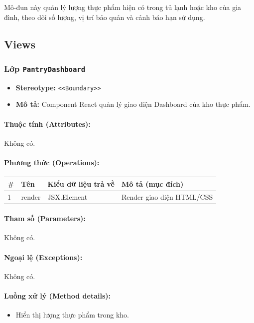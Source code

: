 \documentclass[12pt,a4paper]{article}
\begin{document}
Mô-đun này quản lý lượng thực phẩm hiện có trong tủ lạnh hoặc kho của gia đình, theo dõi số lượng, vị trí bảo quản và cảnh báo hạn sử dụng.

\subsection{Views}

\subsubsection{Lớp \texttt{PantryDashboard}}
\begin{itemize}[leftmargin=*]
    \item \textbf{Stereotype:} \texttt{\textless{}\textless{}Boundary\textgreater{}\textgreater{}}
    \item \textbf{Mô tả:} Component React quản lý giao diện Dashboard của kho thực phẩm.
\end{itemize}

\paragraph{Thuộc tính (Attributes):}
Không có.

\paragraph{Phương thức (Operations):}
\begin{longtable}{|p{0.6cm}|p{3.8cm}|p{2.6cm}|p{6.5cm}|}
\hline
\textbf{\#} & \textbf{Tên} & \textbf{Kiểu dữ liệu trả về} & \textbf{Mô tả (mục đích)} \\ \hline
\endhead
1 & render & JSX.Element & Render giao diện HTML/CSS \\ \hline
\end{longtable}

\paragraph{Tham số (Parameters):}
Không có.

\paragraph{Ngoại lệ (Exceptions):}
Không có.

\paragraph{Luồng xử lý (Method details):}
\begin{itemize}[leftmargin=*]
    \item Hiển thị lượng thực phẩm trong kho.
\end{itemize}
\end{document}
